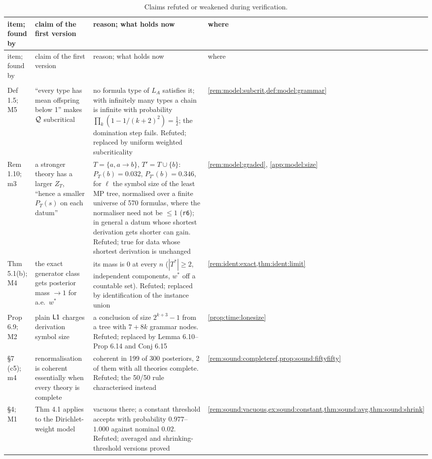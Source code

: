 {\footnotesize
\begin{longtable}{@{}>{\raggedright\arraybackslash}p{1.9cm}>{\raggedright\arraybackslash}p{4.3cm}>{\raggedright\arraybackslash}p{6.1cm}>{\raggedright\arraybackslash}p{2.6cm}@{}}
\caption{Claims refuted or weakened during verification.}\label{tab:ver:corrections}\\
\toprule
item; found by & claim of the first version & reason; what holds now & where\\
\midrule
\endfirsthead
\toprule
item; found by & claim of the first version & reason; what holds now & where\\
\midrule
\endhead
\bottomrule
\endfoot
\multicolumn{4}{@{}l}{\emph{model track}}\\
Def 1.5; M5 & ``every type has mean offspring below 1'' makes $\mathcal{Q}$ subcritical & no formula type of $L_A$ satisfies it; with infinitely many types a chain is infinite with probability $\prod_k(1-1/(k+2)^2)=\frac12$; the domination step fails. Refuted; replaced by uniform weighted subcriticality & \cref{rem:model:subcrit,def:model:grammar}\\
Rem 1.10; m3 & a stronger theory has a larger $Z_T$, ``hence a smaller $P_T(s)$ on each datum'' & $T=\{a,a\to b\}$, $T'=T\cup\{b\}$: $P_T(b)=0.032$, $P_{T'}(b)=0.346$, for $\ell$ the symbol size of the least MP tree, normalised over a finite universe of 570 formulas, where the normaliser need not be $\le1$ (\texttt{r6}); in general a datum whose shortest derivation gets shorter can gain. Refuted; true for data whose shortest derivation is unchanged & \cref{rem:model:graded}, \cref{app:model:size}\\
Thm 5.1(b); M4 & the exact generator class gets posterior mass $\to1$ for a.e.\ $w^*$ & its mass is $0$ at every $n$ ($|T^*|\ge2$, independent components, $w^*$ off a countable set). Refuted; replaced by identification of the instance union & \cref{rem:ident:exact,thm:ident:limit}\\
Prop 6.9; M2 & plain $\mathord{\mathsf{L1}}$ charges derivation symbol size & a conclusion of size $2^{k+3}-1$ from a tree with $7+8k$ grammar nodes. Refuted; replaced by Lemma 6.10--Prop 6.14 and Conj 6.15 & \cref{prop:time:lonesize}\\
\S7 (c5); m4 & renormalisation is coherent essentially when every theory is complete & coherent in 199 of 300 posteriors, 2 of them with all theories complete. Refuted; the 50/50 rule characterised instead & \cref{rem:sound:completeref,prop:sound:fiftyfifty}\\
\S4; M1 & Thm 4.1 applies to the Dirichlet-weight model & vacuous there; a constant threshold accepts with probability $0.977$--$1.000$ against nominal $0.02$. Refuted; averaged and shrinking-threshold versions proved & \cref{rem:sound:vacuous,ex:sound:constant,thm:sound:avg,thm:sound:shrink}\\

\end{longtable}}
